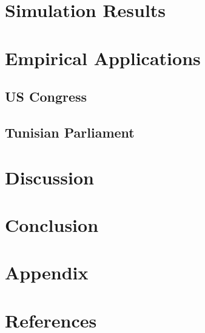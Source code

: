 	
	
	
	
	
	
	
	\section*{Simulation Results}
	
	\section*{Empirical Applications}
	
	\subsection*{US Congress}
	
	\subsection*{Tunisian Parliament}
	
	\section*{Discussion}
	
	\section*{Conclusion}
	
	\section*{Appendix}
	
	\section*{References}
	
	
	
